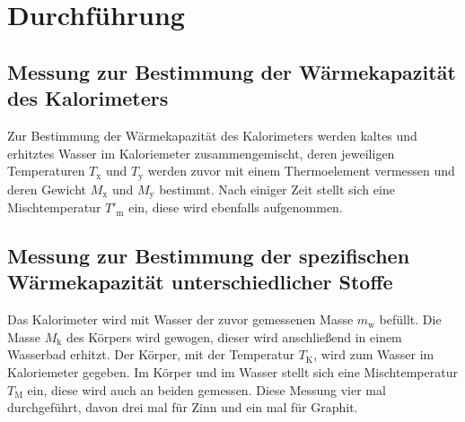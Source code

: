 \section{Durchführung}
\label{sec:Durchführung}
\subsection{Messung zur Bestimmung der Wärmekapazität des Kalorimeters}
Zur Bestimmung der Wärmekapazität des Kalorimeters werden kaltes und erhitztes
Wasser im Kaloriemeter zusammengemischt, deren jeweiligen Temperaturen
$T_{\mathrm{x}}$ und $T_{\mathrm{y}}$ werden zuvor mit einem
Thermoelement vermessen und deren Gewicht $M_{\mathrm{x}}$ und $M_{\mathrm{y}}$
bestimmt. Nach einiger Zeit stellt sich eine Mischtemperatur $T'_{\mathrm{m}}$
ein, diese wird ebenfalls aufgenommen.

\subsection{Messung zur Bestimmung der spezifischen Wärmekapazität unterschiedlicher Stoffe}
Das Kalorimeter wird mit Wasser der zuvor gemessenen Masse $m_{\mathrm{w}}$ befüllt.
Die Masse $M_\mathrm{k}$ des Körpers wird gewogen, dieser wird anschließend in einem
Wasserbad erhitzt. Der Körper, mit der Temperatur $T_{\mathrm{K}}$, wird zum Wasser
im Kaloriemeter gegeben. Im Körper und im Wasser stellt sich eine Mischtemperatur
$T_{\mathrm{M}}$ ein, diese wird auch an beiden gemessen.
Diese Messung vier mal durchgeführt, davon drei mal für Zinn und ein mal für Graphit.
